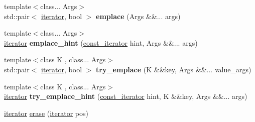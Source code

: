 \begin{DoxyCompactItemize}
\item 
\mbox{\label{classtsl_1_1detail__ordered__hash_1_1ordered__hash_a2a32ed18e284bccbd8e07b3313f83ed8}} 
{\footnotesize template$<$class... Args$>$ }\\std\+::pair$<$ \mbox{\hyperlink{classtsl_1_1detail__ordered__hash_1_1ordered__hash_1_1ordered__iterator}{iterator}}, bool $>$ {\bfseries emplace} (Args \&\&... args)
\item 
\mbox{\label{classtsl_1_1detail__ordered__hash_1_1ordered__hash_a5084187f2502c308f952d63f6ea0566e}} 
{\footnotesize template$<$class... Args$>$ }\\\mbox{\hyperlink{classtsl_1_1detail__ordered__hash_1_1ordered__hash_1_1ordered__iterator}{iterator}} {\bfseries emplace\+\_\+hint} (\mbox{\hyperlink{classtsl_1_1detail__ordered__hash_1_1ordered__hash_1_1ordered__iterator}{const\+\_\+iterator}} hint, Args \&\&... args)
\item 
\mbox{\label{classtsl_1_1detail__ordered__hash_1_1ordered__hash_a8ec0d039f714770c8ddcf13f97c0aa56}} 
{\footnotesize template$<$class K , class... Args$>$ }\\std\+::pair$<$ \mbox{\hyperlink{classtsl_1_1detail__ordered__hash_1_1ordered__hash_1_1ordered__iterator}{iterator}}, bool $>$ {\bfseries try\+\_\+emplace} (K \&\&key, Args \&\&... value\+\_\+args)
\item 
\mbox{\label{classtsl_1_1detail__ordered__hash_1_1ordered__hash_a1ff848f035159e58e04fdf66d57b51b1}} 
{\footnotesize template$<$class K , class... Args$>$ }\\\mbox{\hyperlink{classtsl_1_1detail__ordered__hash_1_1ordered__hash_1_1ordered__iterator}{iterator}} {\bfseries try\+\_\+emplace\+\_\+hint} (\mbox{\hyperlink{classtsl_1_1detail__ordered__hash_1_1ordered__hash_1_1ordered__iterator}{const\+\_\+iterator}} hint, K \&\&key, Args \&\&... args)
\item 
\mbox{\hyperlink{classtsl_1_1detail__ordered__hash_1_1ordered__hash_1_1ordered__iterator}{iterator}} \mbox{\hyperlink{classtsl_1_1detail__ordered__hash_1_1ordered__hash_ae14571eebf96dca56ae81c42c345cb15}{erase}} (\mbox{\hyperlink{classtsl_1_1detail__ordered__hash_1_1ordered__hash_1_1ordered__iterator}{iterator}} pos)

\end{DoxyCompactItemize}
